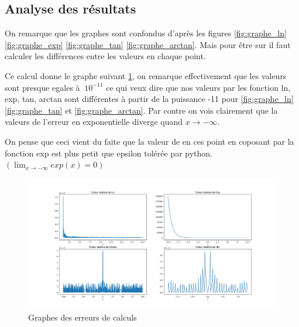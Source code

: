 \documentclass{article}
\begin{document}
\subsection{Analyse des résultats}
On remarque que les graphes sont confondus d'après les figures \ref{fig:graphe_ln} \ref{fig:graphe_exp} \ref{fig:graphe_tan} \ref{fig:graphe_arctan}.
Mais pour être sur il faut calculer les différences entre les valeurs en chaque point.

Ce calcul donne le graphe suivant \ref{fig:erreurs}, on remarque effectivement que les valeurs sont presque egales à $~10^{-11}$ ce qui veux dire que nos valeurs par les fonction {ln, exp, tan, arctan} sont différentes à partir de la puissance -11 pour \ref{fig:graphe_ln} \ref{fig:graphe_tan} et \ref{fig:graphe_arctan}. Par contre on vois clairement que la valeurs de l'erreur en exponentielle diverge quand  $x \to-\infty$.

On pense que ceci vient du faite que la valeur de en ces point en coposant par la fonction exp est plus petit que epsilon tolérée par python. $(\lim_{x \to -\infty} exp(x) =0)$


\begin{figure}[!h]
    \centering
    \includegraphics[width=200mm,scale=1.5]{res/Erreur_relative_p2.png}
    \caption{Graphes des erreurs de calculs}
    \label{fig:erreurs}
\end{figure}
\end{document}

